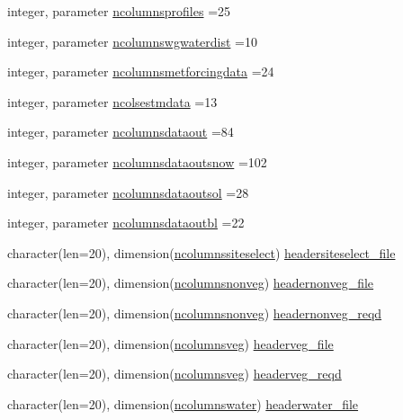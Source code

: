 \begin{DoxyCompactItemize}
\item 
integer, parameter \hyperlink{namespaceallocatearray_a505dab229d9725bdbe44d06de37dceba}{ncolumnsprofiles} =25
\item 
integer, parameter \hyperlink{namespaceallocatearray_a85d1a0c9782006900e2d2a379ba269c8}{ncolumnswgwaterdist} =10
\item 
integer, parameter \hyperlink{namespaceallocatearray_a4e277be816ec99df48ea96cc54eb4f62}{ncolumnsmetforcingdata} =24
\item 
integer, parameter \hyperlink{namespaceallocatearray_a19316fda887ef62f890249051fdaa79f}{ncolsestmdata} =13
\item 
integer, parameter \hyperlink{namespaceallocatearray_a9408900bed6c87ed095d2c688c1506a0}{ncolumnsdataout} =84
\item 
integer, parameter \hyperlink{namespaceallocatearray_ab4a2c7e53ba41245b200baa41aed6137}{ncolumnsdataoutsnow} =102
\item 
integer, parameter \hyperlink{namespaceallocatearray_a3fbe7b1c5c42eb749b860207893f16cd}{ncolumnsdataoutsol} =28
\item 
integer, parameter \hyperlink{namespaceallocatearray_a45295cba02de86a1053db4c80f07ec19}{ncolumnsdataoutbl} =22
\item 
character(len=20), dimension(\hyperlink{namespaceallocatearray_a0fc6d13698e2122d715ea6e5758194d9}{ncolumnssiteselect}) \hyperlink{namespaceallocatearray_ad113ac656f4ca34ffd377081c3d86d54}{headersiteselect\+\_\+file}
\item 
character(len=20), dimension(\hyperlink{namespaceallocatearray_a820ebcf66504982dee392a9c3a224fe2}{ncolumnsnonveg}) \hyperlink{namespaceallocatearray_a1acf417768a18d09c33f89053383fd90}{headernonveg\+\_\+file}
\item 
character(len=20), dimension(\hyperlink{namespaceallocatearray_a820ebcf66504982dee392a9c3a224fe2}{ncolumnsnonveg}) \hyperlink{namespaceallocatearray_a13ad90de9ec05be3e8fcce9b8dd62155}{headernonveg\+\_\+reqd}
\item 
character(len=20), dimension(\hyperlink{namespaceallocatearray_a6b492adaf9d6e5563a21d571d5b8f6ec}{ncolumnsveg}) \hyperlink{namespaceallocatearray_a48a3f0534f696697267a63f0173f3f23}{headerveg\+\_\+file}
\item 
character(len=20), dimension(\hyperlink{namespaceallocatearray_a6b492adaf9d6e5563a21d571d5b8f6ec}{ncolumnsveg}) \hyperlink{namespaceallocatearray_ab4bd7d25443d66ffc38582ff46579d6e}{headerveg\+\_\+reqd}
\item 
character(len=20), dimension(\hyperlink{namespaceallocatearray_a58f6aaf0837a4d8d3383254237a26732}{ncolumnswater}) \hyperlink{namespaceallocatearray_a39b586061937f9441f9d0b7288a71133}{headerwater\+\_\+file}

\end{DoxyCompactItemize}
